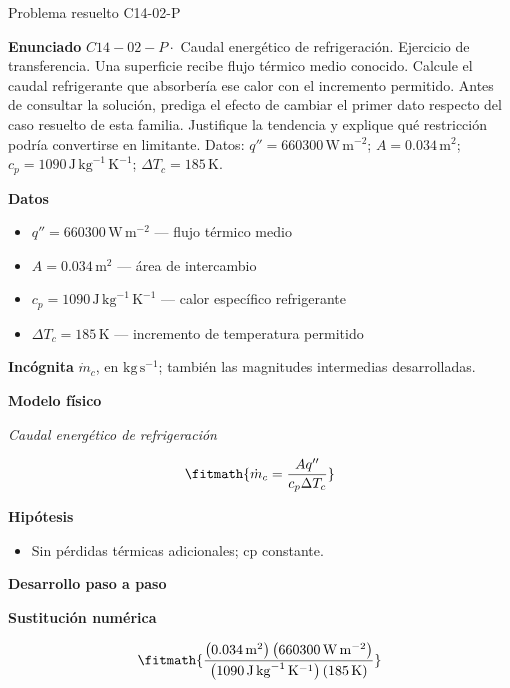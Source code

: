 \documentclass[10pt,openany]{book}
\begin{document}
\begin{studiumworked}{Problema resuelto C14-02-P}


\noindent\textbf{Enunciado}
\(C14-02-P \cdot\) Caudal energético de refrigeración. Ejercicio de transferencia. Una superficie recibe flujo térmico medio conocido. Calcule el caudal refrigerante que absorbería ese calor con el incremento permitido. Antes de consultar la solución, prediga el efecto de cambiar el primer dato respecto del caso resuelto de esta familia. Justifique la tendencia y explique qué restricción podría convertirse en limitante. Datos: \(q''=660300\, \mathrm{W}\,\mathrm{m}^{-2}\); \(A=0.034\, \mathrm{m}^{2}\); \(c_p=1090\, \mathrm{J}\,\mathrm{kg}^{-1}\,\mathrm{K}^{-1}\); \(\Delta T_c=185\, \mathrm{K}\).

\noindent\textbf{Datos}
\begin{itemize}
\item $q'' = 660300\,\mathrm{W}\,\mathrm{m}^{-2}$ — flujo térmico medio
\item $A = 0.034\,\mathrm{m}^{2}$ — área de intercambio
\item $c_p = 1090\,\mathrm{J}\,\mathrm{kg}^{-1}\,\mathrm{K}^{-1}$ — calor específico refrigerante
\item $\Delta T_c = 185\,\mathrm{K}$ — incremento de temperatura permitido
\end{itemize}

\noindent\textbf{Incógnita}
$\dot{m}_c$, en $\mathrm{kg\,s^{-1}}$; también las magnitudes intermedias desarrolladas.

\noindent\textbf{Modelo físico}

\noindent\textit{Caudal energético de refrigeración}

\[
\fitmath{\dot{m}_c=\frac{A q''}{c_p \Delta T_c}}
\]

\noindent\textbf{Hipótesis}
\begin{itemize}
\item Sin pérdidas térmicas adicionales; cp constante.
\end{itemize}

\noindent\textbf{Desarrollo paso a paso}



\noindent\textbf{Sustitución numérica}

\[
\fitmath{\frac{\left(0.034\,\mathrm{m}^{2}\right) \left(660300\,\mathrm{W}\,\mathrm{m}^{-2}\right)}{\left(1090\,\mathrm{J}\,\mathrm{kg}^{-1}\,\mathrm{K}^{-1}\right) \left(185\,\mathrm{K}\right)}}
\]


\end{studiumworked}
\end{document}
